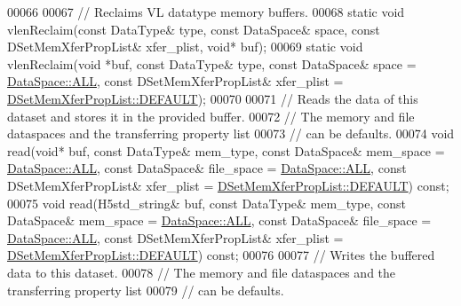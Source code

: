 \begin{DoxyCode}
00066 
00067         \textcolor{comment}{// Reclaims VL datatype memory buffers.}
00068         \textcolor{keyword}{static} \textcolor{keywordtype}{void} vlenReclaim(\textcolor{keyword}{const} DataType& type, \textcolor{keyword}{const} DataSpace& space, \textcolor{keyword}{const} DSetMemXferPropList& 
      xfer\_plist, \textcolor{keywordtype}{void}* buf);
00069         \textcolor{keyword}{static} \textcolor{keywordtype}{void} vlenReclaim(\textcolor{keywordtype}{void} *buf, \textcolor{keyword}{const} DataType& type, \textcolor{keyword}{const} DataSpace& space = 
      \hyperlink{class_h5_1_1_data_space_ae8a22405edd631eb923a327d39462ff2}{DataSpace::ALL}, \textcolor{keyword}{const} DSetMemXferPropList& xfer\_plist = 
      \hyperlink{class_h5_1_1_d_set_mem_xfer_prop_list_ae69bf0ec7bccd4bb793ffe1ff770d8c4}{DSetMemXferPropList::DEFAULT});
00070 
00071         \textcolor{comment}{// Reads the data of this dataset and stores it in the provided buffer.}
00072         \textcolor{comment}{// The memory and file dataspaces and the transferring property list}
00073         \textcolor{comment}{// can be defaults.}
00074         \textcolor{keywordtype}{void} read(\textcolor{keywordtype}{void}* buf, \textcolor{keyword}{const} DataType& mem\_type, \textcolor{keyword}{const} DataSpace& mem\_space = 
      \hyperlink{class_h5_1_1_data_space_ae8a22405edd631eb923a327d39462ff2}{DataSpace::ALL}, \textcolor{keyword}{const} DataSpace& file\_space = \hyperlink{class_h5_1_1_data_space_ae8a22405edd631eb923a327d39462ff2}{DataSpace::ALL}, \textcolor{keyword}{const} 
      DSetMemXferPropList& xfer\_plist = \hyperlink{class_h5_1_1_d_set_mem_xfer_prop_list_ae69bf0ec7bccd4bb793ffe1ff770d8c4}{DSetMemXferPropList::DEFAULT}) \textcolor{keyword}{const};
00075         \textcolor{keywordtype}{void} read(H5std\_string& buf, \textcolor{keyword}{const} DataType& mem\_type, \textcolor{keyword}{const} DataSpace& mem\_space = 
      \hyperlink{class_h5_1_1_data_space_ae8a22405edd631eb923a327d39462ff2}{DataSpace::ALL}, \textcolor{keyword}{const} DataSpace& file\_space = \hyperlink{class_h5_1_1_data_space_ae8a22405edd631eb923a327d39462ff2}{DataSpace::ALL}, \textcolor{keyword}{const} 
      DSetMemXferPropList& xfer\_plist = \hyperlink{class_h5_1_1_d_set_mem_xfer_prop_list_ae69bf0ec7bccd4bb793ffe1ff770d8c4}{DSetMemXferPropList::DEFAULT}) \textcolor{keyword}{const};
00076 
00077         \textcolor{comment}{// Writes the buffered data to this dataset.}
00078         \textcolor{comment}{// The memory and file dataspaces and the transferring property list}
00079         \textcolor{comment}{// can be defaults.}

\end{DoxyCode}
